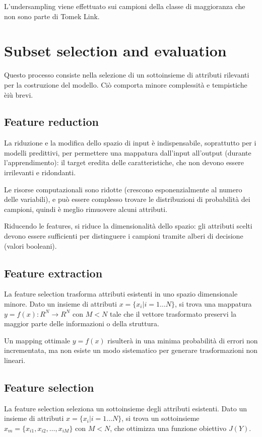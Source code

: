L'undersampling viene effettuato sui campioni della classe di maggioranza che non sono parte di Tomek Link. 

\section{Subset selection and evaluation}
Questo processo consiste nella selezione di un sottoinsieme di attributi rilevanti per la costruzione del modello. Ciò comporta minore complessità e tempistiche èiù brevi.

\subsection{Feature reduction}
La riduzione e la modifica dello spazio di input è indispensabile, soprattutto per i modelli predittivi, per permettere una mappatura dall'input all'output (durante l'apprendimento): il target eredita delle caratteristiche, che non devono essere irrilevanti e ridondanti.

Le risorse computazionali sono ridotte (crescono esponenzialmente al numero delle variabili), e può essere complesso trovare le distribuzioni di probabilità dei campioni, quindi è meglio rimuovere alcuni attributi.

Riducendo le features, si riduce la dimensionalità dello spazio: gli attributi scelti devono essere sufficienti per distinguere i campioni tramite alberi di decisione (valori booleani). 

\subsection{Feature extraction}
La feature selection trasforma attributi esistenti in uno spazio dimensionale minore. Dato un insieme di attributi $x = \{x_i | i = 1 \dots N\}$, si trova una mappatura $y = f(x) : R^N \rightarrow R^N$ con $M < N$ tale che il vettore trasformato preservi la maggior parte delle informazioni o della struttura.

Un mapping ottimale $y = f(x)$ risulterà in una minima probabilità di errori non incrementata, ma non esiste un modo sistematico per generare trasformazioni non lineari. 

\subsection{Feature selection}
La feature selection seleziona un sottoinsieme degli attributi esistenti. Dato un insieme di attributi $x = \{x_i | i = 1 \dots N\}$, si trova un sottoinsieme $x_m = \{x_{i1}, x_{i2}, \dots, x_{iM}\}$ con $M < N$, che ottimizza una funzione obiettivo $J(Y)$.

